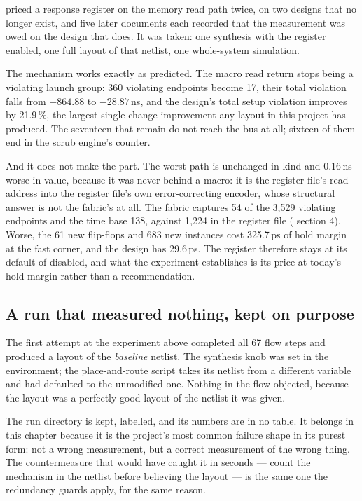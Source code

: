  priced a response register on the memory read path twice,
on two designs that no longer exist, and five later documents each
recorded that the measurement was owed on the design that does. It was
taken: one synthesis with the register enabled, one full layout of that
netlist, one whole-system simulation.

The mechanism works exactly as  predicted. The macro read
return stops being a violating launch group: 360 violating endpoints
become 17, their total violation falls from $-864.88$ to $-28.87$\,ns,
and the design's total setup violation improves by 21.9\,\%, the
largest single-change improvement any layout in this project has
produced. The seventeen that remain do not reach the bus at all;
sixteen of them end in the scrub engine's counter.

And it does not make the part. The worst path is unchanged in kind and
0.16\,ns worse in value, because it was never behind a macro: it is the
register file's read address into the register file's own error-correcting
encoder, whose structural answer is not the fabric's at all. The fabric
captures 54 of the 3{,}529 violating endpoints and the time base 138,
against 1{,}224 in the register file ( section 4). Worse, the 61 new
flip-flops and 683 new instances cost 325.7\,ps of hold margin at the
fast corner, and the design has 29.6\,ps. The register therefore stays
at its default of disabled, and what the experiment establishes is its
price at today's hold margin rather than a recommendation.

\subsection{A run that measured nothing, kept on purpose}

The first attempt at the experiment above completed all 67 flow steps
and produced a layout of the \emph{baseline} netlist. The synthesis
knob was set in the environment; the place-and-route script takes its
netlist from a different variable and had defaulted to the unmodified
one. Nothing in the flow objected, because the layout was a perfectly
good layout of the netlist it was given.

The run directory is kept, labelled, and its numbers are in no table.
It belongs in this chapter because it is the project's most common
failure shape in its purest form: not a wrong measurement, but a
correct measurement of the wrong thing. The countermeasure that would
have caught it in seconds --- count the mechanism in the netlist before
believing the layout --- is the same one the redundancy guards apply,
for the same reason.
